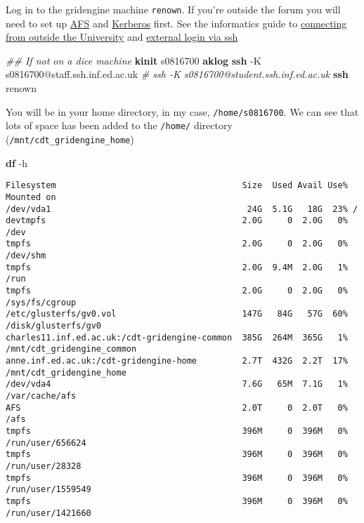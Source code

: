 \documentclass[]{article}
\newenvironment{Shaded}{\begin{snugshade}}{\end{snugshade}}
\newcommand{\KeywordTok}[1]{\textcolor[rgb]{0.13,0.29,0.53}{\textbf{{#1}}}}
\newcommand{\CommentTok}[1]{\textcolor[rgb]{0.56,0.35,0.01}{\textit{{#1}}}}
\newcommand{\NormalTok}[1]{{#1}}
\begin{document}
Log in to the gridengine machine \texttt{renown}. If you're outside the
forum you will need to set up
\href{http://computing.help.inf.ed.ac.uk/informatics-filesystem}{AFS}
and \href{http://computing.help.inf.ed.ac.uk/TAGS/kerberos}{Kerberos}
first. See the informatics guide to
\href{http://computing.help.inf.ed.ac.uk/connecting-home-overview}{connecting
from outside the University} and
\href{http://computing.help.inf.ed.ac.uk/external-login}{external login
via ssh}

\begin{Shaded}
\begin{Highlighting}[]
\CommentTok{## If not on a dice machine}
\KeywordTok{kinit} \NormalTok{s0816700}
\KeywordTok{aklog}
\KeywordTok{ssh} \NormalTok{-K s0816700@staff.ssh.inf.ed.ac.uk}
\CommentTok{# ssh -K s0816700@student.ssh.inf.ed.ac.uk}
\KeywordTok{ssh} \NormalTok{renown}
\end{Highlighting}
\end{Shaded}

You will be in your home directory, in my case, \texttt{/home/s0816700}.
We can see that lots of space has been added to the \texttt{/home/}
directory (\texttt{/mnt/cdt\_gridengine\_home})

\begin{Shaded}
\begin{Highlighting}[]
\KeywordTok{df} \NormalTok{-h}
\end{Highlighting}
\end{Shaded}

\begin{verbatim}
Filesystem                                     Size  Used Avail Use% Mounted on
/dev/vda1                                       24G  5.1G   18G  23% /
devtmpfs                                       2.0G     0  2.0G   0% /dev
tmpfs                                          2.0G     0  2.0G   0% /dev/shm
tmpfs                                          2.0G  9.4M  2.0G   1% /run
tmpfs                                          2.0G     0  2.0G   0% /sys/fs/cgroup
/etc/glusterfs/gv0.vol                         147G   84G   57G  60% /disk/glusterfs/gv0
charles11.inf.ed.ac.uk:/cdt-gridengine-common  385G  264M  365G   1% /mnt/cdt_gridengine_common
anne.inf.ed.ac.uk:/cdt-gridengine-home         2.7T  432G  2.2T  17% /mnt/cdt_gridengine_home
/dev/vda4                                      7.6G   65M  7.1G   1% /var/cache/afs
AFS                                            2.0T     0  2.0T   0% /afs
tmpfs                                          396M     0  396M   0% /run/user/656624
tmpfs                                          396M     0  396M   0% /run/user/28328
tmpfs                                          396M     0  396M   0% /run/user/1559549
tmpfs                                          396M     0  396M   0% /run/user/1421660
\end{verbatim}
\end{document}
